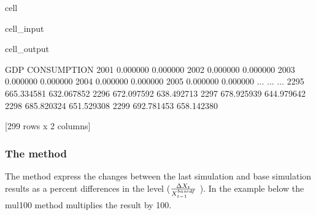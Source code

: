 \documentclass[letterpaper,10pt,english]{jupyterBook}
\begin{document}
\begin{sphinxuseclass}{cell}\begin{sphinxVerbatimInput}

\begin{sphinxuseclass}{cell_input}
\begin{sphinxVerbatim}[commandchars=\\\{\}]
\PYG{p}{[}\PYG{p}{]}
\end{sphinxVerbatim}

\end{sphinxuseclass}\end{sphinxVerbatimInput}
\begin{sphinxVerbatimOutput}

\begin{sphinxuseclass}{cell_output}
\begin{sphinxVerbatim}[commandchars=\\\{\}]
             GDP  CONSUMPTION
2001    0.000000     0.000000
2002    0.000000     0.000000
2003    0.000000     0.000000
2004    0.000000     0.000000
2005    0.000000     0.000000
...          ...          ...
2295  665.334581   632.067852
2296  672.097592   638.492713
2297  678.925939   644.979642
2298  685.820324   651.529308
2299  692.781453   658.142380

[299 rows x 2 columns]
\end{sphinxVerbatim}

\end{sphinxuseclass}\end{sphinxVerbatimOutput}

\end{sphinxuseclass}

\subsubsection{The  method}
\label{\detokenize{content/03_Installation/TestingModelFlow:the-difpct-df-method}}
\sphinxAtStartPar
The  method express the changes between the last simulation and base simulation results as a percent differences in the level (\({\Delta X_t \over X^{basedf}_{t-1}} \) ).  In the example below the mul100 method multiplies the result by 100.
\end{document}
